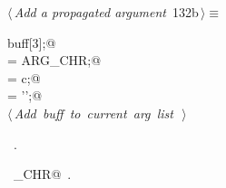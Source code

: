 \documentclass[a4paper]{report}
\begin{document}
\begin{flushleft} \small
\begin{minipage}{\linewidth}\label{scrap281}\raggedright\small
{} $\langle\,${\it Add a propagated argument}\nobreak\ {\footnotesize {132b}}$\,\rangle\equiv$
\vspace{-1ex}
\begin{list}{}{} \item
\mbox{}\verb@char buff[3];@\\
\mbox{}\verb@buff[0] = ARG_CHR;@\\
\mbox{}\verb@buff[1] = c;@\\
\mbox{}\verb@buff[2] = '';@\\
\mbox{}\verb@@\hbox{$\langle\,${\it Add buff to current arg list}\nobreak\ {\footnotesize {}}$\,\rangle$}\verb@@{\NWsep}
\end{list}
\vspace{-1.5ex}
\footnotesize
\begin{list}{}{\setlength{\itemsep}{-\parsep}\setlength{\itemindent}{-\leftmargin}}
\item \NWtxtMacroRefIn\ .
\item \NWtxtIdentsUsed\nobreak\  \verb@ARG_CHR@\nobreak\ .
\item{}
\end{list}
\end{minipage}\vspace{4ex}
\end{flushleft}
\end{document}
